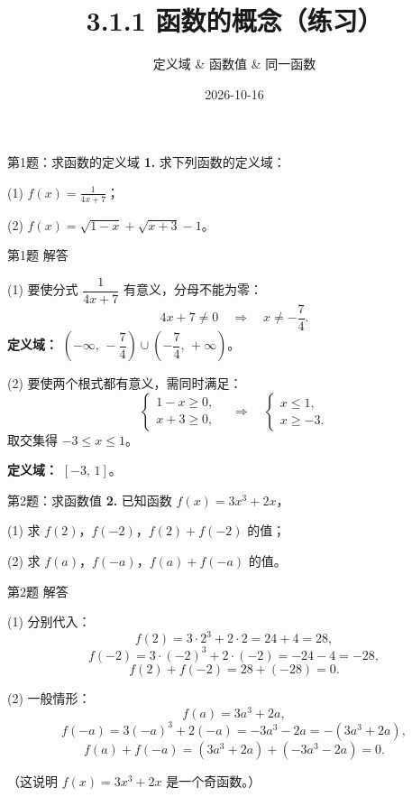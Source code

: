 \documentclass[10pt,aspectratio=169,serif]{beamer}
\title[函数的概念练习]{3.1.1 函数的概念（练习）}
\subtitle{定义域 \& 函数值 \& 同一函数}
\author{}
\institute{}
\date{2026-10-16}
\begin{document}
\begin{frame}
  \titlepage
\end{frame}

\begin{frame}[t]{第1题：求函数的定义域}
\textbf{1.} 求下列函数的定义域：

\vspace{1em}
(1) $\displaystyle f(x)=\frac{1}{4x+7}$；

\vspace{1.5em}
(2) $\displaystyle f(x)=\sqrt{1-x}+\sqrt{x+3}-1$。
\end{frame}

\begin{frame}[t]{第1题 解答}
\begin{tcolorbox}[colback=orange!10,colframe=orange,title=\textbf{解}]
(1) 要使分式 $\dfrac{1}{4x+7}$ 有意义，分母不能为零：
\[
4x+7 \neq 0 \quad\Longrightarrow\quad x \neq -\frac{7}{4}.
\]
\textbf{定义域：} $\left(-\infty,\,-\dfrac{7}{4}\right)\cup\left(-\dfrac{7}{4},\,+\infty\right)$。

\vspace{1em}
(2) 要使两个根式都有意义，需同时满足：
\[
\begin{cases}
1-x \ge 0,\\
x+3 \ge 0,
\end{cases}
\quad\Longrightarrow\quad
\begin{cases}
x \le 1,\\
x \ge -3.
\end{cases}
\]
取交集得 $-3 \le x \le 1$。

\textbf{定义域：} $[-3,\,1]$。
\end{tcolorbox}
\end{frame}

\begin{frame}[t]{第2题：求函数值}
\textbf{2.} 已知函数 $f(x)=3x^3+2x$，

\vspace{1em}
(1) 求 $f(2)$，$f(-2)$，$f(2)+f(-2)$ 的值；

\vspace{1em}
(2) 求 $f(a)$，$f(-a)$，$f(a)+f(-a)$ 的值。
\end{frame}

\begin{frame}[t]{第2题 解答}
\begin{tcolorbox}[colback=orange!10,colframe=orange,title=\textbf{解}]
(1) 分别代入：
\[
f(2)=3\cdot 2^3+2\cdot 2=24+4=28,
\]
\[
f(-2)=3\cdot(-2)^3+2\cdot(-2)=-24-4=-28,
\]
\[
f(2)+f(-2)=28+(-28)=0.
\]

\vspace{0.5em}
(2) 一般情形：
\[
f(a)=3a^3+2a,
\]
\[
f(-a)=3(-a)^3+2(-a)=-3a^3-2a=-(3a^3+2a),
\]
\[
f(a)+f(-a)=(3a^3+2a)+(-3a^3-2a)=0.
\]

\vspace{0.3em}
\small（这说明 $f(x)=3x^3+2x$ 是一个奇函数。）
\end{tcolorbox}
\end{frame}
\end{document}
